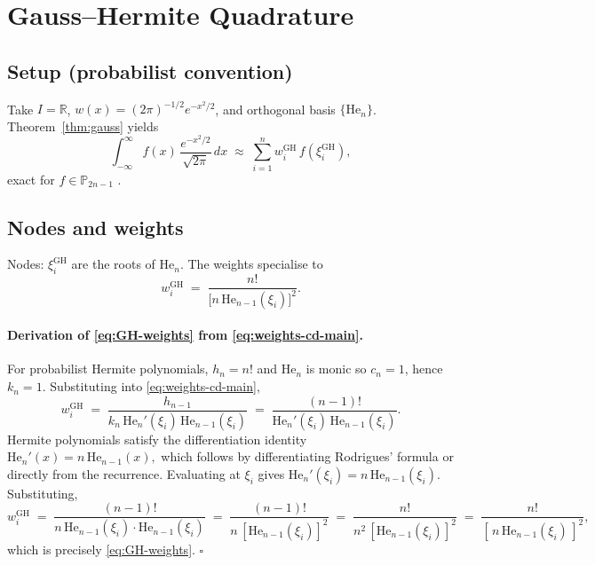 \documentclass[11pt,a4paper]{article}
\theoremstyle{definition}
\newcommand{\R}{\mathbb{R}}
\newcommand{\PP}{\mathbb{P}}
\newcommand{\HE}{\mathrm{He}}
\newcommand{\GH}{\mathrm{GH}}
\begin{document}
\section{Gauss--Hermite Quadrature}\label{sec:GH}

\subsection{Setup (probabilist convention)}

Take $I=\R$, $w(x)=(2\pi)^{-1/2}e^{-x^2/2}$, and orthogonal basis
$\{\HE_n\}$. Theorem~\ref{thm:gauss} yields
\begin{equation}
  \boxed{\;
    \int_{-\infty}^{\infty} f(x)\,\frac{e^{-x^2/2}}{\sqrt{2\pi}}\,dx
    \;\approx\; \sum_{i=1}^n w_i^{\GH}\,f(\xi_i^{\GH}),
  \;}
  \label{eq:GH-main}
\end{equation}
exact for $f\in\PP_{2n-1}$ \cite{StroudSecrest1966}.

\subsection{Nodes and weights}

Nodes: $\xi_i^{\GH}$ are the roots of $\HE_n$. The weights specialise to
\begin{equation}
  w_i^{\GH} \;=\; \frac{n!}{\bigl[n\,\HE_{n-1}(\xi_i)\bigr]^2}.
  \label{eq:GH-weights}
\end{equation}

\paragraph{Derivation of \eqref{eq:GH-weights} from \eqref{eq:weights-cd-main}.}
For probabilist Hermite polynomials, $h_n=n!$ and $\HE_n$ is monic so $c_n=1$,
hence $k_n=1$. Substituting into \eqref{eq:weights-cd-main},
\[
  w_i^{\GH} \;=\;
  \frac{h_{n-1}}{k_n\,\HE_n'(\xi_i)\,\HE_{n-1}(\xi_i)}
  \;=\;
  \frac{(n-1)!}{\HE_n'(\xi_i)\,\HE_{n-1}(\xi_i)}.
\]
Hermite polynomials satisfy the differentiation identity
\(
  \HE_n'(x)=n\,\HE_{n-1}(x),
\)
which follows by differentiating Rodrigues' formula or directly from the
recurrence. Evaluating at $\xi_i$ gives $\HE_n'(\xi_i)=n\,\HE_{n-1}(\xi_i)$.
Substituting,
\[
  w_i^{\GH} \;=\;
  \frac{(n-1)!}{n\,\HE_{n-1}(\xi_i)\cdot\HE_{n-1}(\xi_i)}
  \;=\;
  \frac{(n-1)!}{n\,[\HE_{n-1}(\xi_i)]^2}
  \;=\;
  \frac{n!}{n^2\,[\HE_{n-1}(\xi_i)]^2}
  \;=\;
  \frac{n!}{[\,n\,\HE_{n-1}(\xi_i)\,]^2},
\]
which is precisely \eqref{eq:GH-weights}. $\square$
\end{document}
